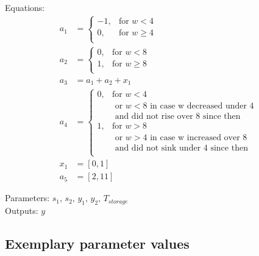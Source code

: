 \documentclass[10pt,a4paper]{article}
\begin{document}
	\noindent Equations:			
	\begin{subequations}
	\begin{align}
		a_1 &= 
		\begin{cases}
        -1, & \text{for } w < 4\\
        0, & \text{for } w\geq 4\\
        \end{cases} \\
        a_2 &= 
		\begin{cases}
        0, & \text{for } w < 8\\
        1, & \text{for } w\geq 8\\
        \end{cases} \\
        a_3 &= a_1 + a_2 + x_1 \\
        a_4 &= 
		\begin{cases}
        0, & \text{for } w < 4 \\
        & \text{ or } w < 8 \text{ in case w decreased under 4} \\
        & \text{ and did not rise over 8 since then}\\
        1, & \text{for } w > 8 \\
        & \text{ or } w > 4 \text{ in case w increased over 8} \\
        & \text{ and did not sink under 4 since then} \\
        \end{cases} \\
        x_1 &= [0, 1] \\
        a_5 &= [2, 11]        
	\end{align}
	\end{subequations}

	\noindent
	Parameters: $s_1, \, s_2, \, y_1, \, y_2, \, T_{storage}$%
	\\
	Outputs: $y$ %
	
	
	
	\subsection{Exemplary parameter values}
	

	
\end{document}
